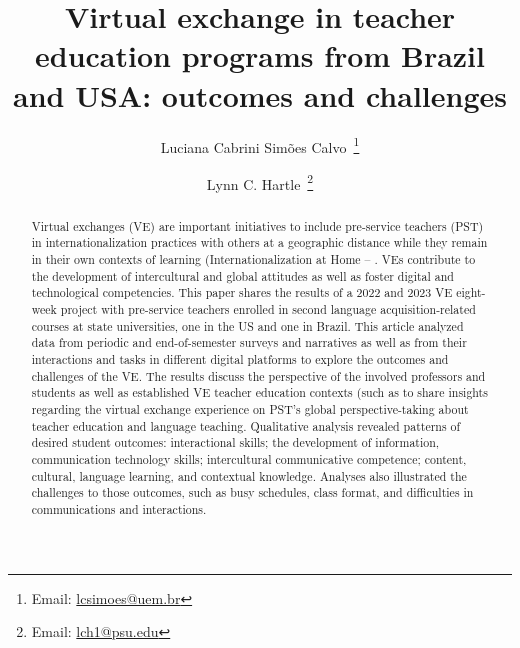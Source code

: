 \documentclass[english]{textolivre}
\title{Virtual exchange in teacher education programs from Brazil and USA: outcomes and challenges}
\author[1]{Luciana Cabrini Simões Calvo~\orcid{0000-0001-8145-0588}\thanks{Email: \href{mailto:lcsimoes@uem.br}{lcsimoes@uem.br}}}
\author[2]{Lynn C. Hartle~\orcid{0000-0002-9268-3309}\thanks{Email: \href{mailto:lch1@psu.edu}{lch1@psu.edu}}}
\affil[1]{Universidade Estadual de Maringá, Maringá, PR, Brasil.}
\affil[2]{The Pennsylvania State University, Brandywine, United States of America.}
\begin{document}
\maketitle
\begin{polyabstract}
\begin{abstract}
Virtual exchanges (VE) are important initiatives to
include pre-service teachers (PST) in internationalization practices
with others at a geographic distance while they remain in their own
contexts of learning (Internationalization at Home -- \cite{beelen2015redefining}. VEs contribute to the development of intercultural and global attitudes as well as foster digital and technological competencies. This paper shares the results of a 2022 and 2023 VE eight-week project with pre-service teachers enrolled in second language acquisition-related courses at state universities, one in the US and one in Brazil. This
article analyzed data from periodic and end-of-semester surveys and
narratives as well as from their interactions and tasks in different
digital platforms to explore the outcomes and challenges of the VE. The
results discuss the perspective of the involved professors and students
as well as established VE teacher education contexts (such as \textcite{hanks2019research,godwin-jones2019telecollaboration} to share insights regarding the virtual exchange experience on PST's global perspective-taking about teacher education and language teaching. Qualitative analysis revealed patterns of desired student outcomes: interactional skills; the development of information, communication technology skills; intercultural
communicative competence; content, cultural, language learning, and
contextual knowledge. Analyses also illustrated the challenges to those
outcomes, such as busy schedules, class format, and difficulties in
communications and interactions.

\end{abstract}


\end{polyabstract}
\end{document}
